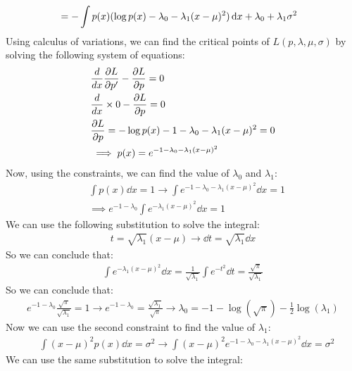 \documentclass[12pt]{article}
\begin{document}
\begin{qsolve}[solution]
\begin{align*}
                                   & = - \int p(x) \large( \log p(x) - \lambda_0 - \lambda_1 (x-\mu)^2 \large) \dd{x} + \lambda_0 + \lambda_1 \sigma^2
    \end{align*}
    Using calculus of variations, we can find the critical points of $L(p, \lambda, \mu, \sigma)$ by solving the following system of equations:
    \begin{align*}
         & \frac{d}{dx} \pdv{L}{p'} - \pdv{L}{p}        = 0                   \\
         & \frac{d}{dx} \times 0 - \pdv{L}{p}            = 0                  \\
         & \pdv{L}{p} = - \log p(x) - 1 - \lambda_0 - \lambda_1 (x-\mu)^2 = 0 \\
         & \implies p(x) = e^{-1-\lambda_0-\lambda_1(x-\mu)^2}
    \end{align*}
    Now, using the constraints, we can find the value of $\lambda_0$ and $\lambda_1$:
    \begin{align*}
         & \int p(x) \dd{x}  = 1 \rightarrow \int e^{-1-\lambda_0-\lambda_1(x-\mu)^2} \dd{x} = 1 \\
         & \implies e^{-1-\lambda_0} \int e^{-\lambda_1(x-\mu)^2} \dd{x} = 1
    \end{align*}
    \splitqsolve
    We can use the following substitution to solve the integral:
    \begin{align*}
        t = \sqrt{\lambda_1}(x-\mu) \rightarrow \dd{t} = \sqrt{\lambda_1} \dd{x}
    \end{align*}
    So we can conclude that:
    \begin{align*}
        \int e^{-\lambda_1(x-\mu)^2} \dd{x} = \frac{1}{\sqrt{\lambda_1}} \int e^{-t^2} \dd{t} = \frac{\sqrt{\pi}}{\sqrt{\lambda_1}}
    \end{align*}
    So we can conclude that:
    \begin{align*}
        e^{-1-\lambda_0} \frac{\sqrt{\pi}}{\sqrt{\lambda_1}} = 1 \rightarrow e^{-1-\lambda_0} = \frac{\sqrt{\lambda_1}}{\sqrt{\pi}} \rightarrow \lambda_0 = -1 - \log(\sqrt{\pi}) - \frac{1}{2}\log(\lambda_1)
    \end{align*}
    Now we can use the second constraint to find the value of $\lambda_1$:
    \begin{align*}
         & \int (x-\mu)^2 p(x) \dd{x} = \sigma^2 \rightarrow \int (x-\mu)^2 e^{-1-\lambda_0-\lambda_1(x-\mu)^2} \dd{x} = \sigma^2
    \end{align*}
    We can use the same substitution to solve the integral:

\end{qsolve}
\end{document}
